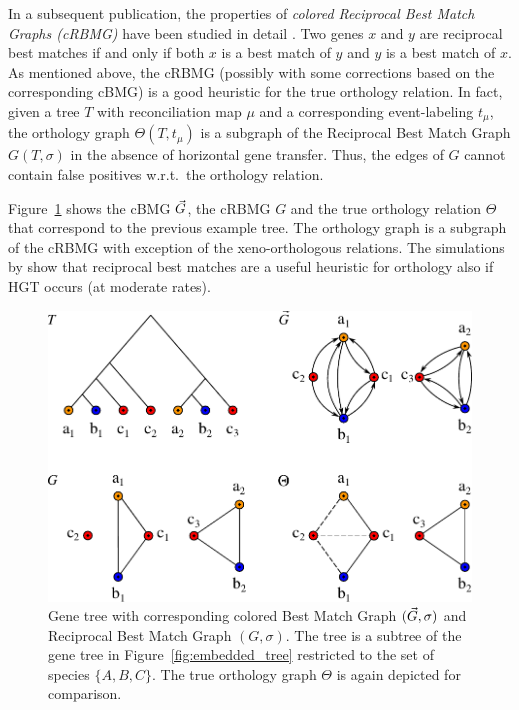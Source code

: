 \documentclass[hidelinks,11pt]{scrreprt}
\def\arrowedvec{\mathaccent"017E}
\newcommand{\G}{\arrowedvec{G}}
\begin{document}
\vspace{5mm}
In a subsequent publication, the properties of \emph{colored Reciprocal Best Match Graphs (cRBMG)} have been studied in detail \citep{geiss2020b}. Two genes $x$ and $y$ are reciprocal best matches if and only if both $x$ is a best match of $y$ and $y$ is a best match of $x$. As mentioned above, the cRBMG (possibly with some corrections based on the corresponding cBMG) is a good heuristic for the true orthology relation.
In fact, given a tree $T$ with reconciliation map $\mu$ and a corresponding event-labeling $t_\mu$, the orthology graph $\Theta(T,t_\mu)$ is a subgraph of the Reciprocal Best Match Graph $G(T,\sigma)$ \citep[Theorem~2]{geiss2020c} in the absence of horizontal gene transfer. Thus, the edges of $G$ cannot contain false positives w.r.t.\ the orthology relation.

Figure~\ref{fig:best_match_example} shows the cBMG $\G$, the cRBMG $G$ and the true orthology relation $\Theta$ that correspond to the previous example tree. The orthology graph is a subgraph of the cRBMG with exception of the xeno-orthologous relations. The simulations by \citet{geiss2020c} show that reciprocal best matches are a useful heuristic for orthology also if HGT occurs (at moderate rates).

\vspace{5mm}
\begin{figure}[ht]
	\begin{center}     
		\includegraphics[width=0.65\columnwidth]{best_match_example.pdf}
	\end{center}
	\caption[Gene tree with corresponding cBMG and cRBMG]{Gene tree with corresponding colored Best Match Graph $(\G,\sigma)$ and Reciprocal Best Match Graph $(G,\sigma)$. The tree is a subtree of the gene tree in Figure~\ref{fig:embedded_tree} restricted to the set of species $\{A,B,C\}$. The true orthology graph $\Theta$ is again depicted for comparison.}
	\label{fig:best_match_example}
\end{figure}
\end{document}

